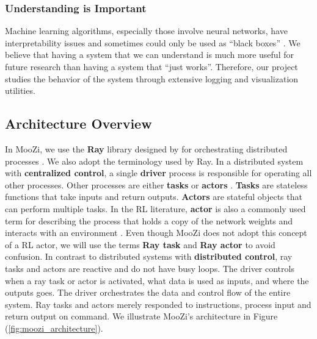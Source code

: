 \subsubsection{Understanding is Important}
Machine learning algorithms, especially those involve neural networks, have interpretability issues and sometimes could only be used as ``black boxes'' \cite{ExplainableAIReview_Linardatos.Papastefanopoulos.ea_2021}.
We believe that having a system that we can understand is much more useful for future research than having a system that ``just works''.
Therefore, our project studies the behavior of the system through extensive logging and visualization utilities.

\subsection{Architecture Overview}
In MooZi, we use the \textbf{Ray} library designed by \citeauthor{RayDistributedFramework_Moritz.Nishihara.ea_2018}
for orchestrating distributed processes \cite{RayDistributedFramework_Moritz.Nishihara.ea_2018}.
We also adopt the terminology used by Ray.
In a distributed system with \textbf{centralized control}, a single \textbf{driver} process is responsible for operating all other processes.
Other processes are either \textbf{tasks} or \textbf{actors} .
\textbf{Tasks} are stateless functions that take inputs and return outputs.
\textbf{Actors} are stateful objects that can perform multiple tasks.
In the RL literature, \textbf{actor} is also a commonly used term for describing the process that holds a copy of the network weights and interacts with an environment \cite{SEEDRLScalable_Espeholt.Marinier.ea_2020, IMPALAScalableDistributed_Espeholt.Soyer.ea_2018}.
Even though MooZi does not adopt this concept of a RL actor, we will use the terms \textbf{Ray task} and \textbf{Ray actor} to avoid confusion.
In contrast to distributed systems with \textbf{distributed control}, ray tasks and actors are reactive and do not have busy loops.
The driver controls when a ray task or actor is activated, what data is used as inputs, and where the outputs goes.
The driver orchestrates the data and control flow of the entire system.
Ray tasks and actors merely responded to instructions, process input and return output on command.
We illustrate MooZi's architecture in Figure (\ref{fig:moozi_architecture}).

